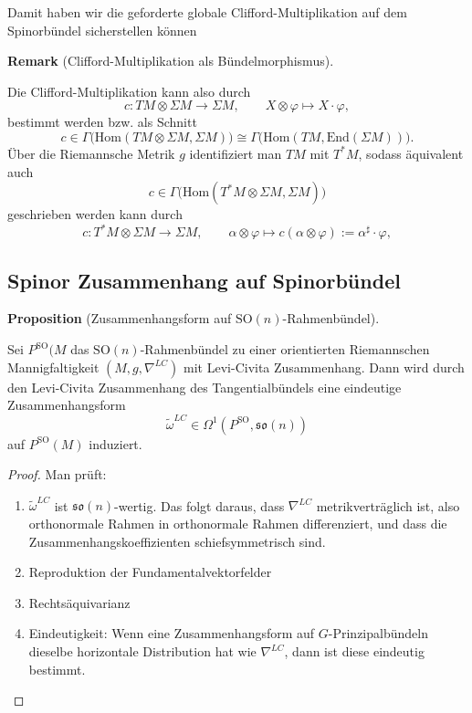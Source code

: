 \documentclass[10pt, letterpaper]{article}
\newcommand{\End}{\mathrm{End}}
\newcommand{\Hom}{\mathrm{Hom}}
\newcommand{\SO}{\mathrm{SO}}
\newcommand{\CustomHeading}[3]{%
  \par\medskip\noindent%
  \textbf{#1 #2} \textnormal{(#3)}.\enskip%
}
\newenvironment{PROP}[2]{\CustomHeading{Proposition}{#1}{#2}}{}
\newenvironment{REM}[2]{\CustomHeading{Remark}{#1}{#2}}{}
\begin{document}
Damit haben wir die geforderte globale Clifford-Multiplikation auf dem Spinorbündel sicherstellen können

\begin{REM}{}{Clifford-Multiplikation als Bündelmorphismus}
Die Clifford-Multiplikation kann also durch
\[
c: TM\otimes \Sigma M \to \Sigma M,\qquad X\otimes \varphi \mapsto X\cdot \varphi,
\]
bestimmt werden bzw. als Schnitt
\[
c\in \Gamma\!\bigl(\Hom(TM\otimes \Sigma M,\Sigma M)\bigr)
\cong \Gamma\!\bigl(\Hom(TM,\End(\Sigma M))\bigr).
\]
Über die Riemannsche Metrik $g$ identifiziert man $TM$ mit $T^*M$, sodass äquivalent auch
\[
c\in \Gamma\!\bigl(\Hom(T^*M\otimes \Sigma M,\Sigma M)\bigr)
\]
geschrieben werden kann durch
\[
c:T^*M\otimes \Sigma M\to \Sigma M,\qquad \alpha\otimes \varphi\mapsto c(\alpha\otimes \varphi):=\alpha^\sharp\cdot\varphi,
\]
\end{REM}





\pagebreak





\subsection{Spinor Zusammenhang auf Spinorbündel}

\begin{PROP}{}{Zusammenhangsform auf $\SO(n)$-Rahmenbündel}
  Sei $P^{\SO}(M$ das $\SO(n)$-Rahmenbündel zu einer orientierten Riemannschen Mannigfaltigkeit $(M,g,\nabla^{LC})$ mit Levi-Civita Zusammenhang. Dann wird durch den Levi-Civita Zusammenhang des Tangentialbündels eine eindeutige Zusammenhangsform 
  $$\widetilde\omega^{LC}\in \Omega^1(P^\SO,\mathfrak{so}(n))$$ 
  auf $P^\SO(M)$ induziert.
\end{PROP}

\begin{proof}
  Man prüft: 
  \begin{enumerate}
    \item $\widetilde{\omega}^{L C}$ ist $\mathfrak{s o}(n)$-wertig. Das folgt daraus, dass $\nabla^{L C}$ metrikverträglich ist, also orthonormale Rahmen in orthonormale Rahmen differenziert, und dass die Zusammenhangskoeffizienten schiefsymmetrisch sind. 
    \item Reproduktion der Fundamentalvektorfelder
    \item Rechtsäquivarianz
    \item Eindeutigkeit: Wenn eine Zusammenhangsform auf $G$-Prinzipalbündeln dieselbe horizontale Distribution hat wie $\nabla^{LC}$, dann ist diese eindeutig bestimmt.
  \end{enumerate} 
\end{proof}
\end{document}
